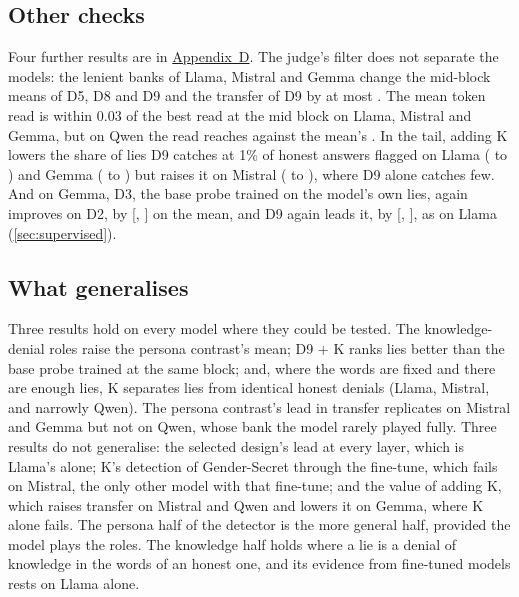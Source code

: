 \subsection{Other checks}
\label{sec:xm-other}

Four further results are in \hyperref[app:xmodel]{Appendix~D}. The judge's filter does not separate the
models: the lenient banks of Llama, Mistral and Gemma change the mid-block means of D5, D8 and D9 and the
transfer of D9 by at most . The mean token read is within 0.03 of the best read at the
mid block on Llama, Mistral and Gemma, but on Qwen the  read reaches
 against the mean's . In the tail, adding K lowers the share of
lies D9 catches at 1\% of honest answers flagged on Llama ( to
) and Gemma ( to ) but raises it on
Mistral ( to ), where D9 alone catches few. And on Gemma,
D3, the base probe trained on the model's own lies, again improves on D2, by 
[, ] on the mean, and D9 again leads it, by
 [, ], as on Llama
(\cref{sec:supervised}).

\subsection{What generalises}
\label{sec:xm-summary}

Three results hold on every model where they could be tested. The knowledge-denial roles raise the persona
contrast's mean; D9 + K ranks lies better than the base probe trained at the same block; and, where the
words are fixed and there are enough lies, K separates lies from identical honest denials (Llama, Mistral,
and narrowly Qwen). The persona contrast's lead in transfer replicates on Mistral and Gemma but not on Qwen,
whose bank the model rarely played fully. Three results do not generalise: the selected design's lead at
every layer, which is Llama's alone; K's detection of Gender-Secret through the fine-tune, which fails on
Mistral, the only other model with that fine-tune; and the value of adding K, which raises transfer on
Mistral and Qwen and lowers it on Gemma, where K alone fails. The persona half of the detector is the more
general half, provided the model plays the roles. The knowledge half holds where a lie is a denial of
knowledge in the words of an honest one, and its evidence from fine-tuned models rests on Llama alone.

